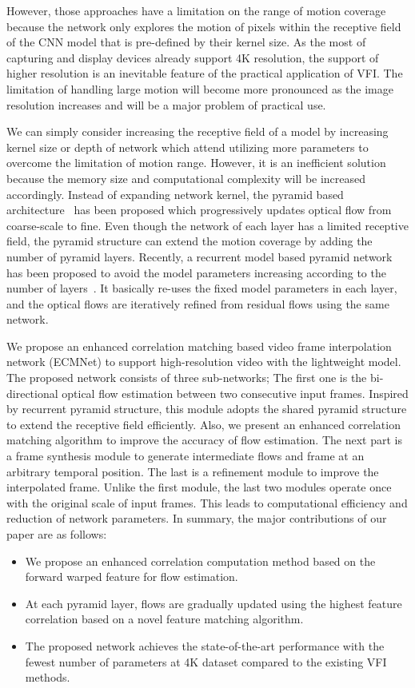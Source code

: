 \documentclass[10pt,twocolumn,letterpaper]{article}
\begin{document}
However, those approaches have a limitation on the range of motion coverage because the network only explores the motion of pixels within the receptive field of the CNN model that is pre-defined by their kernel size. 
As the most of capturing and display devices already support 4K resolution, the support of higher resolution is an inevitable feature of the practical application of VFI. 
The limitation of handling large motion will become more pronounced as the image resolution increases and will be a major problem of practical use.

We can simply consider increasing the receptive field of a model by increasing kernel size or depth of network which attend utilizing more parameters to overcome the limitation of motion range. However, it is an inefficient solution because the memory size and computational complexity will be increased accordingly. 
Instead of expanding network kernel, the pyramid based architecture~\cite{sun2018pwc, teed2020raft} has been proposed which progressively updates optical flow from coarse-scale to fine. Even though the network of each layer has a limited receptive field, the pyramid structure can extend the motion coverage by adding the number of pyramid layers. Recently, a recurrent model based pyramid network has been proposed to avoid the model parameters increasing according to the number of layers~\cite{sim2021xvfi, zhang2020flexible}. It basically re-uses the fixed model parameters in each layer, and the optical flows are iteratively refined from residual flows using the same network.

We propose an enhanced correlation matching based video frame interpolation network (ECMNet) to support high-resolution video with the lightweight model. The proposed network consists of three sub-networks; 
The first one is the bi-directional optical flow estimation between two consecutive input frames. Inspired by recurrent pyramid structure, this module adopts the shared pyramid structure to extend the receptive field efficiently. Also, we present an enhanced correlation matching algorithm to improve the accuracy of flow estimation.
The next part is a frame synthesis module to generate intermediate flows and frame at an arbitrary temporal position. The last is a refinement module to improve the interpolated frame. Unlike the first module, the last two modules operate once with the original scale of input frames. This leads to computational efficiency and reduction of network parameters.
In summary, the major contributions of our paper are as follows:
\begin{itemize}
    \item We propose an enhanced correlation computation method based on the forward warped feature for flow estimation.
    \item At each pyramid layer, flows are gradually updated using the highest feature correlation based on a novel feature matching algorithm.
    \item The proposed network achieves the state-of-the-art performance with the fewest number of parameters at 4K dataset compared to the existing VFI methods.
\end{itemize}
\end{document}
